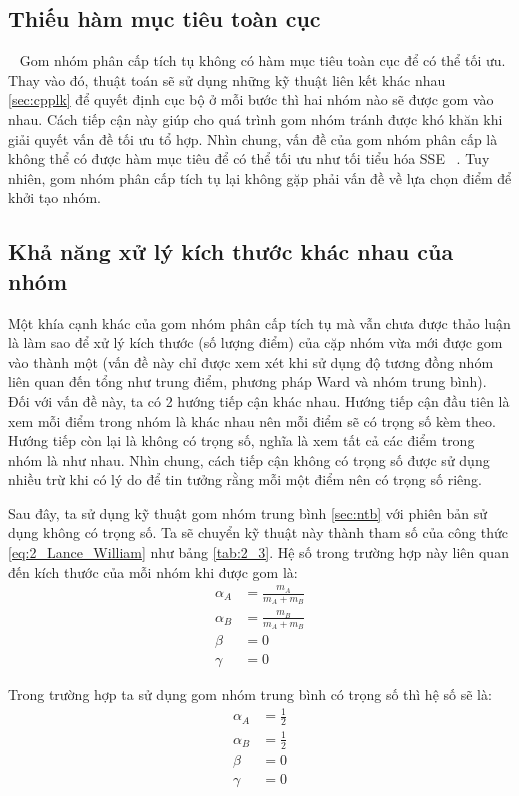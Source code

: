 \subsection{Thiếu hàm mục tiêu toàn cục}
~\cite{Vipin-Kumar} Gom nhóm phân cấp tích tụ không có hàm mục tiêu toàn cục để có thể tối ưu.
Thay vào đó, thuật toán sẽ sử dụng những kỹ thuật liên kết khác nhau \ref{sec:cpplk} để quyết định cục bộ ở mỗi bước thì hai nhóm nào sẽ được gom vào nhau.
Cách tiếp cận này giúp cho quá trình gom nhóm tránh được khó khăn khi giải quyết vấn đề tối ưu tổ hợp.
Nhìn chung, vấn đề của gom nhóm phân cấp là không thể có được hàm mục tiêu để có thể tối ưu như tối tiểu hóa SSE ~\cite{SSE}.
Tuy nhiên, gom nhóm phân cấp tích tụ lại không gặp phải vấn đề về lựa chọn điểm để khởi tạo nhóm.

\subsection{Khả năng xử lý kích thước khác nhau của nhóm}
Một khía cạnh khác của gom nhóm phân cấp tích tụ mà vẫn chưa được thảo luận là làm sao để xử lý kích thước (số lượng điểm) của cặp nhóm vừa mới được gom vào thành một (vấn đề này chỉ được xem xét khi sử dụng độ tương đồng nhóm liên quan đến tổng như trung điểm, phương pháp Ward và nhóm trung bình).
Đối với vấn đề này, ta có 2 hướng tiếp cận khác nhau.
Hướng tiếp cận đầu tiên là xem mỗi điểm trong nhóm là khác nhau nên mỗi điểm sẽ có trọng số kèm theo.
Hướng tiếp còn lại là không có trọng số, nghĩa là xem tất cả các điểm trong nhóm là như nhau.
Nhìn chung, cách tiếp cận không có trọng số được sử dụng nhiều trừ khi có lý do để tin tưởng rằng mỗi một điểm nên có trọng số riêng.

Sau đây, ta sử dụng kỹ thuật gom nhóm trung bình \ref{sec:ntb} với phiên bản sử dụng không có trọng số.
Ta sẽ chuyển kỹ thuật này thành tham số của công thức \ref{eq:2_Lance_William} như bảng \ref{tab:2_3}.
Hệ số trong trường hợp này liên quan đến kích thước của mỗi nhóm khi được gom là:
\begin{equation}
\begin{aligned}
\alpha_A &= \frac{m_A}{m_A + m_B}	\\
\alpha_B &= \frac{m_B}{m_A + m_B}	\\
\beta &= 0		\\
\gamma &= 0
\end{aligned}
\end{equation}

Trong trường hợp ta sử dụng gom nhóm trung bình có trọng số thì hệ số sẽ là:
\begin{equation}
\begin{aligned}
\alpha_A &= \frac{1}{2} \\
\alpha_B &= \frac{1}{2} \\
\beta &= 0		\\
\gamma &= 0		\\
\end{aligned}
\end{equation}

